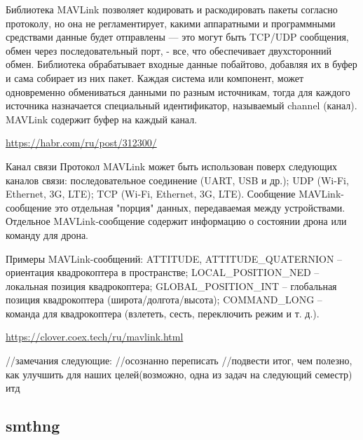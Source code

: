 
Библиотека MAVLink позволяет кодировать и раскодировать пакеты согласно протоколу, но она не регламентирует, какими аппаратными и программными средствами данные будет отправлены — это могут быть TCP/UDP сообщения, обмен через последовательный порт, - все, что обеспечивает двухсторонний обмен. Библиотека обрабатывает входные данные побайтово, добавляя их в буфер и сама собирает из них пакет. Каждая система или компонент, может одновременно обмениваться данными по разным источникам, тогда для каждого источника назначается специальный идентификатор, называемый channel (канал). MAVLink содержит буфер на каждый канал.

\url{https://habr.com/ru/post/312300/}

Канал связи
Протокол MAVLink может быть использован поверх следующих каналов связи:
последовательное соединение (UART, USB и др.);
UDP (Wi-Fi, Ethernet, 3G, LTE);
TCP (Wi-Fi, Ethernet, 3G, LTE).
Сообщение
MAVLink-сообщение это отдельная "порция" данных, передаваемая между устройствами. Отдельное MAVLink-сообщение содержит информацию о состоянии дрона или команду для дрона.

Примеры MAVLink-сообщений:
ATTITUDE, ATTITUDE\_QUATERNION – ориентация квадрокоптера в пространстве;
LOCAL\_POSITION\_NED – локальная позиция квадрокоптера;
GLOBAL\_POSITION\_INT – глобальная позиция квадрокоптера (широта/долгота/высота);
COMMAND\_LONG – команда для квадрокоптера (взлететь, сесть, переключить режим и т. д.).

\url{https://clover.coex.tech/ru/mavlink.html}

//замечания следующие:
//осознанно переписать
//подвести итог, чем полезно, как улучшить для наших целей(возможно, одна из задач на следующий семестр) итд

\subsection{smthng}
